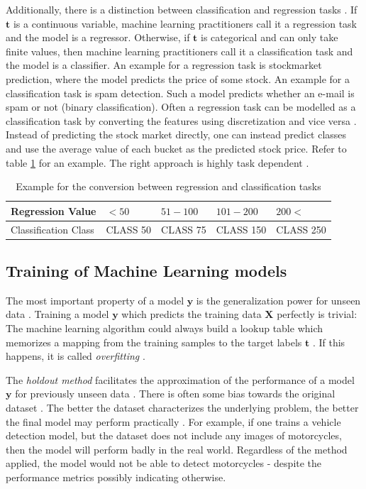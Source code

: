 \documentclass[draft,final,oneside]{vutinfth} %
\begin{document}
Additionally, there is a distinction between classification and regression tasks \cite{bishop}. If $\boldsymbol{t}$ is a continuous variable, machine learning practitioners call it a regression task and the model is a regressor. Otherwise, if $\boldsymbol{t}$ is categorical and can only take finite  values, then machine learning practitioners call it a classification task and the model is a classifier. An example for a regression task is stockmarket prediction, where the model predicts the price of some stock. An example for a classification task is spam detection. Such a model predicts whether an e-mail is spam or not (binary classification). Often a regression task can be modelled as a classification task by converting the features using discretization and vice versa \cite{discretization}. Instead of predicting the stock market directly, one can instead predict classes and use the average value of each bucket as the predicted stock price. Refer to table \ref{table:conversionregressclass} for an example. The right approach is highly task dependent \cite{aimodern}.

\begin{table}[]
\centering
\begin{tabular}{|l||l|l|l|l|}
\hline
Regression Value & $<50$ & $51 - 100$ & $101 - 200$ & $200<$ \\
\hline
Classification Class & CLASS 50      & CLASS 75 & CLASS 150 & CLASS 250 \\
\hline
\end{tabular}
\caption{Example for the conversion between regression and classification tasks }
\label{table:conversionregressclass}
\end{table}

\subsection{Training of Machine Learning models} \label{trainingofml}

The most important property of a model $\boldsymbol{y}$ is the generalization power for unseen data \cite{bishop}. Training a model $\boldsymbol{y}$ which predicts the training data $\boldsymbol{X}$ perfectly is trivial: The machine learning algorithm could always build a lookup table which memorizes a mapping from the training samples to the target labels $\boldsymbol{t}$ \cite{overfitting}. If this happens, it is called \textit{overfitting} \cite{overfitting}.

The \textit{holdout method} facilitates the approximation of the performance of a model $\boldsymbol{y}$ for previously unseen data \cite{holdoutcrossvalidation}. There is often some bias towards the original dataset \cite{datasetbias}. The better the dataset characterizes the underlying problem, the better the final model may perform practically \cite{datasetshift}. For example, if one trains a vehicle detection model, but the dataset does not include any images of motorcycles, then the model will perform badly in the real world. Regardless of the method applied, the model would not be able to detect motorcycles - despite the performance metrics possibly indicating otherwise.
\end{document}
